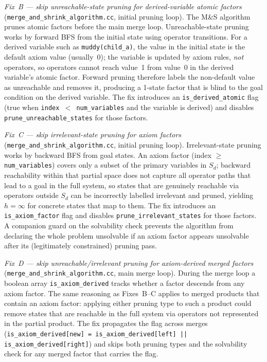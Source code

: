 \documentclass[11pt,a4paper]{article}
\begin{document}
    \emph{Fix~B --- skip unreachable-state pruning for derived-variable atomic factors}
    (\texttt{merge\_and\_shrink\_algorithm.cc}, initial pruning loop).
    The M\&S algorithm prunes atomic factors before the main merge loop.
    Unreachable-state pruning works by forward BFS from the initial state
    using operator transitions.
    For a derived variable such as \texttt{muddy(child\_a)}, the value in the
    initial state is the default axiom value (usually~0); the variable is
    updated by axiom rules, \emph{not} operators, so operators cannot reach
    value~1 from value~0 in the derived variable's atomic factor.
    Forward pruning therefore labels the non-default value as unreachable
    and removes it, producing a 1-state factor that is blind to the goal
    condition on the derived variable.
    The fix introduces an \texttt{is\_derived\_atomic} flag (true when
    \texttt{index $<$ num\_variables} and the variable is derived) and
    disables \texttt{prune\_unreachable\_states} for those factors.

    \emph{Fix~C --- skip irrelevant-state pruning for axiom factors}
    (\texttt{merge\_and\_shrink\_algorithm.cc}, initial pruning loop).
    Irrelevant-state pruning works by backward BFS from goal states.
    An axiom factor (index $\geq$ \texttt{num\_variables}) covers only a
    subset of the primary variables in $S_d$; backward reachability within
    that partial space does not capture all operator paths that lead to a
    goal in the full system, so states that are genuinely reachable via
    operators outside $S_d$ can be incorrectly labelled irrelevant and
    pruned, yielding $h = \infty$ for concrete states that map to them.
    The fix introduces an \texttt{is\_axiom\_factor} flag and disables
    \texttt{prune\_irrelevant\_states} for those factors.
    A companion guard on the solvability check prevents the
    algorithm from declaring the whole problem unsolvable if an axiom
    factor appears unsolvable after its (legitimately constrained) pruning
    pass.

    \emph{Fix~D --- skip unreachable/irrelevant pruning for axiom-derived merged factors}
    (\texttt{merge\_and\_shrink\_algorithm.cc}, main merge loop).
    During the merge loop a boolean array \texttt{is\_axiom\_derived} tracks
    whether a factor descends from any axiom factor.
    The same reasoning as Fixes~B--C applies to merged products that contain
    an axiom factor: applying either pruning type to such a product could
    remove states that are reachable in the full system via operators not
    represented in the partial product.
    The fix propagates the flag across merges
    (\texttt{is\_axiom\_derived[new] = is\_axiom\_derived[left] || is\_axiom\_derived[right]})
    and skips both pruning types and the solvability check for any merged
    factor that carries the flag.
\end{document}

